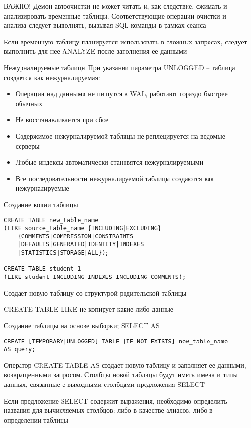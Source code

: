 \documentclass[12pt]{article}
\begin{document}
\begin{Remark}{ВАЖНО!}
    Демон автоочистки не может читать и, как следствие, сжимать и анализировать временные таблицы. Соответствующие операции очистки и анализа следует выполнять, вызывая SQL-команды в рамках сеанса 

    Если временную таблицу планируется использовать в сложных запросах, следует выполнить для нее ANALYZE после заполнения ее данными 
\end{Remark}

\begin{defin}{Нежурналируемые таблицы}
    При указании параметра UNLOGGED -- таблица создается как нежурналируемая:

    \begin{itemize}
        \item Операции над данными не пишутся в WAL, работают гораздо быстрее обычных 
        \item Не восстанавливается при сбое 
        \item Содержимое нежурналируемой таблицы не реплецируется на ведомые серверы 
        \item Любые индексы автоматически становятся нежурналируемыми 
        \item Все последовательности нежурналируемой таблицы создаются как нежурналируемые 
    \end{itemize}
\end{defin}

\begin{nota}{Создание копии таблицы}
\begin{lstlisting}
CREATE TABLE new_table_name 
(LIKE source_table_name {INCLUDING|EXCLUDING} 
    {COMMENTS|COMPRESSION|CONSTRAINTS
    |DEFAULTS|GENERATED|IDENTITY|INDEXES
    |STATISTICS|STORAGE|ALL});

CREATE TABLE student_1
(LIKE student INCLUDING INDEXES INCLUDING COMMENTS);
\end{lstlisting}

    Создает новую таблицу со структурой родительской таблицы

    CREATE TABLE LIKE не копирует какие-либо данные 
\end{nota}

\begin{defin}{Создание таблицы на основе выборки; SELECT AS}
\begin{lstlisting}
CREATE [TEMPORARY|UNLOGGED] TABLE [IF NOT EXISTS] new_table_name
AS query;
\end{lstlisting}

    Оператор CREATE TABLE AS создает новую таблицу и заполняет ее данными, возвращенными запросом. Столбцы новой таблицы будут иметь имена и типы данных, связанные с выходными столбцами предложения SELECT 

    Если предложение SELECT содержит выражения, необходимо определить названия для вычисляемых столбцов: либо в качестве алиасов, либо в определении таблицы 
\end{defin}
\end{document}
